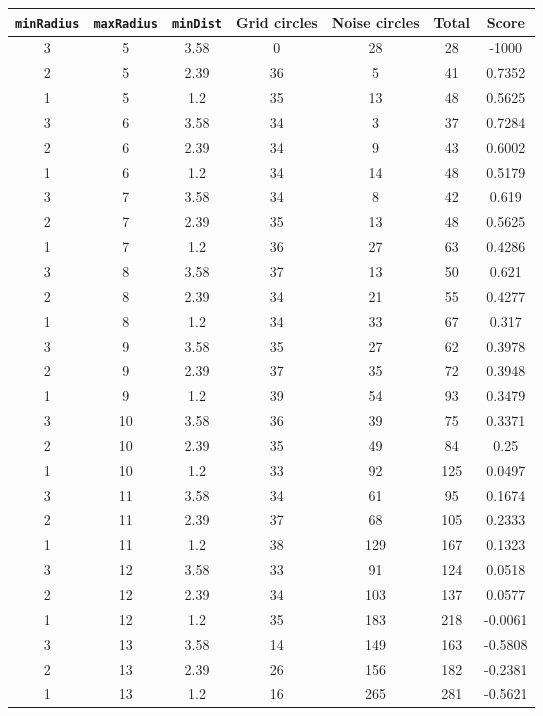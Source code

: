 \documentclass[letterpaper, 12pt]{article}
\begin{document}
\begin{longtable}{|c|c|c|c|c|c|c|}
\hline
\textbf{\texttt{minRadius}} & \textbf{\texttt{maxRadius}} & \textbf{\texttt{minDist}} & \textbf{Grid circles} & \textbf{Noise circles} & \textbf{Total} & \textbf{Score} \\
\hline
3 & 5 & 3.58 & 0 & 28 & 28 & -1000 \\
\hline
2 & 5 & 2.39 & 36 & 5 & 41 & 0.7352 \\
\hline
1 & 5 & 1.2 & 35 & 13 & 48 & 0.5625 \\
\hline
3 & 6 & 3.58 & 34 & 3 & 37 & 0.7284 \\
\hline
2 & 6 & 2.39 & 34 & 9 & 43 & 0.6002 \\
\hline
1 & 6 & 1.2 & 34 & 14 & 48 & 0.5179 \\
\hline
3 & 7 & 3.58 & 34 & 8 & 42 & 0.619 \\
\hline
2 & 7 & 2.39 & 35 & 13 & 48 & 0.5625 \\
\hline
1 & 7 & 1.2 & 36 & 27 & 63 & 0.4286 \\
\hline
3 & 8 & 3.58 & 37 & 13 & 50 & 0.621 \\
\hline
2 & 8 & 2.39 & 34 & 21 & 55 & 0.4277 \\
\hline
1 & 8 & 1.2 & 34 & 33 & 67 & 0.317 \\
\hline
3 & 9 & 3.58 & 35 & 27 & 62 & 0.3978 \\
\hline
2 & 9 & 2.39 & 37 & 35 & 72 & 0.3948 \\
\hline
1 & 9 & 1.2 & 39 & 54 & 93 & 0.3479 \\
\hline
3 & 10 & 3.58 & 36 & 39 & 75 & 0.3371 \\
\hline
2 & 10 & 2.39 & 35 & 49 & 84 & 0.25 \\
\hline
1 & 10 & 1.2 & 33 & 92 & 125 & 0.0497 \\
\hline
3 & 11 & 3.58 & 34 & 61 & 95 & 0.1674 \\
\hline
2 & 11 & 2.39 & 37 & 68 & 105 & 0.2333 \\
\hline
1 & 11 & 1.2 & 38 & 129 & 167 & 0.1323 \\
\hline
3 & 12 & 3.58 & 33 & 91 & 124 & 0.0518 \\
\hline
2 & 12 & 2.39 & 34 & 103 & 137 & 0.0577 \\
\hline
1 & 12 & 1.2 & 35 & 183 & 218 & -0.0061 \\
\hline
3 & 13 & 3.58 & 14 & 149 & 163 & -0.5808 \\
\hline
2 & 13 & 2.39 & 26 & 156 & 182 & -0.2381 \\
\hline
1 & 13 & 1.2 & 16 & 265 & 281 & -0.5621 \\

\end{longtable}
\end{document}

